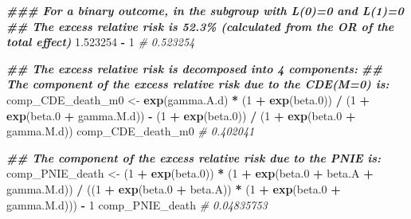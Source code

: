 \documentclass[
]{book}
\newenvironment{Shaded}{\begin{snugshade}}{\end{snugshade}}
\newcommand{\CommentTok}[1]{\textcolor[rgb]{0.56,0.35,0.01}{\textit{#1}}}
\newcommand{\DecValTok}[1]{\textcolor[rgb]{0.00,0.00,0.81}{#1}}
\newcommand{\DocumentationTok}[1]{\textcolor[rgb]{0.56,0.35,0.01}{\textbf{\textit{#1}}}}
\newcommand{\FloatTok}[1]{\textcolor[rgb]{0.00,0.00,0.81}{#1}}
\newcommand{\FunctionTok}[1]{\textcolor[rgb]{0.13,0.29,0.53}{\textbf{#1}}}
\newcommand{\NormalTok}[1]{#1}
\newcommand{\OtherTok}[1]{\textcolor[rgb]{0.56,0.35,0.01}{#1}}
\newcommand{\SpecialCharTok}[1]{\textcolor[rgb]{0.81,0.36,0.00}{\textbf{#1}}}
\begin{document}
\begin{Shaded}
\begin{Highlighting}[]
\DocumentationTok{\#\#\# For a binary outcome, in the subgroup with L(0)=0 and L(1)=0}
\DocumentationTok{\#\# The excess relative risk is 52.3\% (calculated from the OR of the total effect)}
\FloatTok{1.523254} \SpecialCharTok{{-}} \DecValTok{1}
\CommentTok{\# 0.523254}

\DocumentationTok{\#\# The excess relative risk is decomposed into 4 components:}
\DocumentationTok{\#\# The component of the excess relative risk due to the CDE(M=0) is:}
\NormalTok{comp\_CDE\_death\_m0 }\OtherTok{\textless{}{-}} \FunctionTok{exp}\NormalTok{(gamma.A.d) }\SpecialCharTok{*}\NormalTok{ (}\DecValTok{1} \SpecialCharTok{+} \FunctionTok{exp}\NormalTok{(beta}\FloatTok{.0}\NormalTok{)) }\SpecialCharTok{/}
\NormalTok{  (}\DecValTok{1} \SpecialCharTok{+} \FunctionTok{exp}\NormalTok{(beta}\FloatTok{.0} \SpecialCharTok{+}\NormalTok{ gamma.M.d)) }\SpecialCharTok{{-}}
\NormalTok{  (}\DecValTok{1} \SpecialCharTok{+} \FunctionTok{exp}\NormalTok{(beta}\FloatTok{.0}\NormalTok{)) }\SpecialCharTok{/}\NormalTok{ (}\DecValTok{1} \SpecialCharTok{+} \FunctionTok{exp}\NormalTok{(beta}\FloatTok{.0} \SpecialCharTok{+}\NormalTok{ gamma.M.d))}
\NormalTok{comp\_CDE\_death\_m0}
\CommentTok{\# 0.402041}

\DocumentationTok{\#\# The component of the excess relative risk due to the PNIE is:}
\NormalTok{comp\_PNIE\_death }\OtherTok{\textless{}{-}}\NormalTok{ (}\DecValTok{1} \SpecialCharTok{+} \FunctionTok{exp}\NormalTok{(beta}\FloatTok{.0}\NormalTok{)) }\SpecialCharTok{*}\NormalTok{ (}\DecValTok{1} \SpecialCharTok{+} \FunctionTok{exp}\NormalTok{(beta}\FloatTok{.0} \SpecialCharTok{+}\NormalTok{ beta.A }\SpecialCharTok{+}\NormalTok{ gamma.M.d)) }\SpecialCharTok{/}
\NormalTok{  ((}\DecValTok{1} \SpecialCharTok{+} \FunctionTok{exp}\NormalTok{(beta}\FloatTok{.0} \SpecialCharTok{+}\NormalTok{ beta.A)) }\SpecialCharTok{*}\NormalTok{ (}\DecValTok{1} \SpecialCharTok{+} \FunctionTok{exp}\NormalTok{(beta}\FloatTok{.0} \SpecialCharTok{+}\NormalTok{ gamma.M.d))) }\SpecialCharTok{{-}} \DecValTok{1}
\NormalTok{comp\_PNIE\_death}
\CommentTok{\# 0.04835753}


\end{Highlighting}
\end{Shaded}
\end{document}
